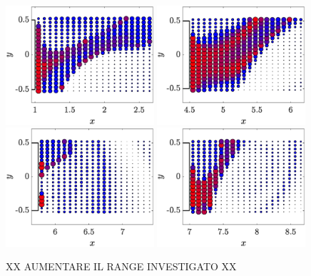 \documentclass{jfm}
\begin{document}
\begin{figure}
  \centering
  \includegraphics[width=0.49\textwidth]{./fig/LagTrac/part_AR1_Re200.eps}
  \includegraphics[width=0.49\textwidth]{./fig/LagTrac/part_AR4p5_Re410.eps}
  \includegraphics[width=0.49\textwidth]{./fig/LagTrac/part_AR5p75_Re550.eps}
  \includegraphics[width=0.49\textwidth]{./fig/LagTrac/part_AR7_Re500.eps}  
  \caption{XX AUMENTARE IL RANGE INVESTIGATO XX}
  \label{fig:part_res}
\end{figure}    
\end{document}
